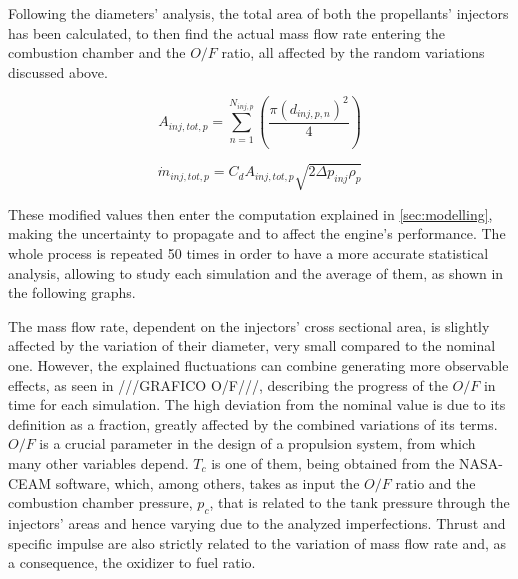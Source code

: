 Following the diameters' analysis, the total area of both the propellants' injectors has been calculated, to then find the actual mass flow rate entering the combustion chamber and the $O/F$ ratio, all affected by the random variations discussed above. 


\begin{equation}
	A_{inj,tot,p} = \sum_{n=1}^{N_{inj,p}} \left(\frac{\pi(d_{inj,p,n})^2}{4} \right)
    \label{eq:totalarea}
\end{equation}

\begin{equation}
    \dot m_{inj,tot,p} = C_{d}A_{inj,tot,p}\sqrt{2\Delta p_{inj}\rho_p}
    \label{eq:massflow}
\end{equation}

These modified values then enter the computation explained in \autoref{sec:modelling}, making the uncertainty to propagate and to affect the engine's performance. The whole process is repeated 50 times in order to have a more accurate statistical analysis, allowing to study each simulation and the average of them, as shown in the following graphs.




The mass flow rate, dependent on the injectors' cross sectional area, is slightly affected by the variation of their diameter, very small compared to the nominal one. However, the explained fluctuations can combine generating more observable effects, as seen in ///GRAFICO O/F///, describing the progress of the $O/F$ in time for each simulation.
The high deviation from the nominal value is due to its definition as a fraction, greatly affected by the combined variations of its terms.
$O/F$ is a crucial parameter in the design of a propulsion system, from which many other variables depend. $T_c$ is one of them, being obtained from the NASA-CEAM software, which, among others, takes as input the $O/F$ ratio and the combustion chamber pressure, $p_c$, that is related to the tank pressure through the injectors' areas and hence varying due to the analyzed imperfections.
Thrust and specific impulse are also strictly related to the variation of mass flow rate and, as a consequence, the oxidizer to fuel ratio.

